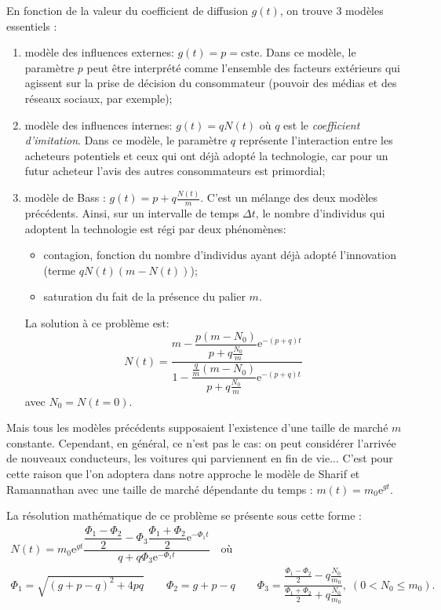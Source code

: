 		En fonction de la valeur du coefficient de diffusion $g(t)$, on trouve 3 modèles essentiels :
		\begin{enumerate}
			\item modèle des influences externes: $g(t) = p = \text{cste}$.
			Dans ce modèle, le paramètre $p$ peut être interprété comme l'ensemble des facteurs extérieurs qui agissent sur la prise de décision du consommateur (pouvoir des médias et des réseaux sociaux, par exemple);
			\item modèle des influences internes: $g(t) = q N(t)$ où $q$ est le \emph{coefficient d'imitation}. Dans ce modèle, le paramètre $q$ représente l'interaction entre les acheteurs potentiels et ceux qui ont déjà adopté la technologie, car pour un futur acheteur l'avis des autres consommateurs est primordial;
			\item modèle de Bass : $g(t) = p + q \frac{N(t)}{m}$. C'est un mélange des deux modèles précédents. Ainsi, sur un intervalle de temps $\Delta t$, le nombre d'individus qui adoptent la technologie est régi par deux phénomènes: 
			\begin{itemize}
				\item contagion, fonction du nombre d'individus ayant déjà adopté l'innovation (terme $q N(t)(m - N(t))$);
				\item saturation du fait de la présence du palier $m$.
			\end{itemize}
			La solution à ce problème est:
				\[
					N(t) = \dfrac{m - \dfrac{p (m - N_0)}{p + q \frac{N_0}{m}} \mathrm{e}^{-(p+q)t}}{1 - \dfrac{\frac{q}{m} (m - N_0)}{p + q \frac{N_0}{m}} \mathrm{e}^{-(p+q)t}}
				\]
			avec $N_0 = N(t = 0)$.
		\end{enumerate}
		
		Mais tous les modèles précédents supposaient l'existence d'une taille de marché $m$ constante. Cependant, en général, ce n'est pas le cas: on peut considérer l'arrivée de nouveaux conducteurs, les voitures qui parviennent en fin de vie... C'est pour cette raison que l'on adoptera dans notre approche le modèle de Sharif et Ramannathan avec une taille de marché dépendante du temps : $m(t) = m_0 \mathrm{e}^{gt}$.
		
		
		La résolution mathématique de ce problème se présente sous cette forme :
		\begin{gather*}
			N(t) = m_0 \mathrm{e}^{gt} \dfrac{\dfrac{\Phi_1 - \Phi_2}{2} - \Phi_3 \dfrac{\Phi_1 + \Phi_2}{2} \mathrm{e}^{-\Phi_1 t}}{q + q \Phi_3 \mathrm{e}^{-\Phi_1 t}} \quad \text{où} \\
			\Phi_1 = \sqrt{(g+p-q)^2 + 4pq} \qquad \Phi_2 = g + p - q \qquad \Phi_3 = \dfrac{\frac{\Phi_1 - \Phi_2}{2} - q \frac{N_0}{m_0}}{\frac{\Phi_1 + \Phi_2}{2} + q \frac{N_0}{m_0}}, \; (0 < N_0 \leqslant m_0).
		\end{gather*}



